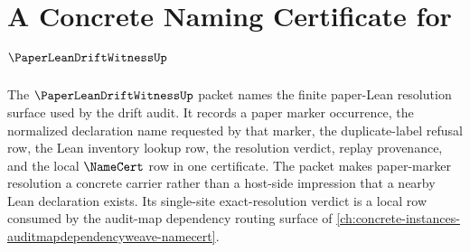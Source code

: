 \chapter{A Concrete Naming Certificate for $\PaperLeanDriftWitnessUp$}
\label{ch:concrete-instances-paper-lean-drift-witness-namecert}

The $\PaperLeanDriftWitnessUp$ packet names the finite paper-Lean resolution surface used by the drift audit. It records a paper marker occurrence, the normalized declaration name requested by that marker, the duplicate-label refusal row, the Lean inventory lookup row, the resolution verdict, replay provenance, and the local $\NameCert$ row in one certificate. The packet makes paper-marker resolution a concrete carrier rather than a host-side impression that a nearby Lean declaration exists. Its single-site exact-resolution verdict is a local row consumed by the audit-map dependency routing surface of \autoref{ch:concrete-instances-auditmapdependencyweave-namecert}.

